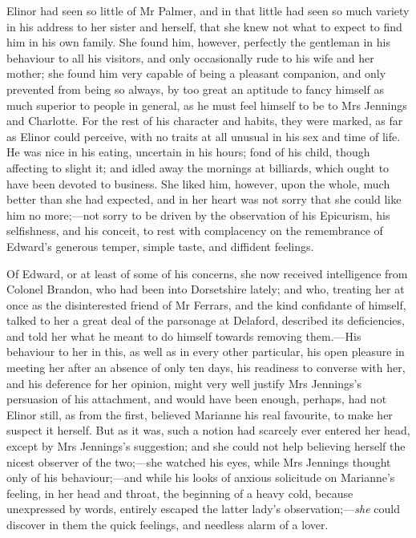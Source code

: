 Elinor had seen so little of Mr Palmer, and in that little had seen so much variety in his address to her sister and herself, that she knew not what to expect to find him in his own family. She found him, however, perfectly the gentleman in his behaviour to all his visitors, and only occasionally rude to his wife and her mother; she found him very capable of being a pleasant companion, and only prevented from being so always, by too great an aptitude to fancy himself as much superior to people in general, as he must feel himself to be to Mrs Jennings and Charlotte. For the rest of his character and habits, they were marked, as far as Elinor could perceive, with no traits at all unusual in his sex and time of life. He was nice in his eating, uncertain in his hours; fond of his child, though affecting to slight it; and idled away the mornings at billiards, which ought to have been devoted to business. She liked him, however, upon the whole, much better than she had expected, and in her heart was not sorry that she could like him no more;—not sorry to be driven by the observation of his Epicurism, his selfishness, and his conceit, to rest with complacency on the remembrance of Edward's generous temper, simple taste, and diffident feelings.

Of Edward, or at least of some of his concerns, she now received intelligence from Colonel Brandon, who had been into Dorsetshire lately; and who, treating her at once as the disinterested friend of Mr Ferrars, and the kind confidante of himself, talked to her a great deal of the parsonage at Delaford, described its deficiencies, and told her what he meant to do himself towards removing them.—His behaviour to her in this, as well as in every other particular, his open pleasure in meeting her after an absence of only ten days, his readiness to converse with her, and his deference for her opinion, might very well justify Mrs Jennings's persuasion of his attachment, and would have been enough, perhaps, had not Elinor still, as from the first, believed Marianne his real favourite, to make her suspect it herself. But as it was, such a notion had scarcely ever entered her head, except by Mrs Jennings's suggestion; and she could not help believing herself the nicest observer of the two;—she watched his eyes, while Mrs Jennings thought only of his behaviour;—and while his looks of anxious solicitude on Marianne's feeling, in her head and throat, the beginning of a heavy cold, because unexpressed by words, entirely escaped the latter lady's observation;—\textit{she} could discover in them the quick feelings, and needless alarm of a lover.

